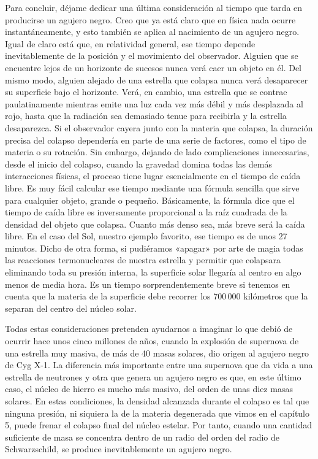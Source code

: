 Para concluir, déjame dedicar una última consideración al tiempo que tarda en producirse un agujero negro. Creo que ya está claro que en física nada ocurre instantáneamente, y esto también se aplica al nacimiento de un agujero negro. Igual de claro está que, en relatividad general, ese tiempo depende inevitablemente de la posición y el movimiento del observador. Alguien que se encuentre lejos de un horizonte de sucesos nunca verá caer un objeto en él. Del mismo modo, alguien alejado de una estrella que colapsa nunca verá desaparecer su superficie bajo el horizonte. Verá, en cambio, una estrella que se contrae paulatinamente mientras emite una luz cada vez más débil y más desplazada al rojo, hasta que la radiación sea demasiado tenue para recibirla y la estrella desaparezca. Si el observador cayera junto con la materia que colapsa, la duración precisa del colapso dependería en parte de una serie de factores, como el tipo de materia o su rotación. Sin embargo, dejando de lado complicaciones innecesarias, desde el inicio del colapso, cuando la gravedad domina todas las demás interacciones físicas, el proceso tiene lugar esencialmente en el tiempo de caída libre. Es muy fácil calcular ese tiempo mediante una fórmula sencilla que sirve para cualquier objeto, grande o pequeño. Básicamente, la fórmula dice que el tiempo de caída libre es inversamente proporcional a la raíz cuadrada de la densidad del objeto que colapsa. Cuanto más denso sea, más breve será la caída libre. En el caso del Sol, nuestro ejemplo favorito, ese tiempo es de unos 27 minutos. Dicho de otra forma, si pudiéramos «apagar» por arte de magia todas las reacciones termonucleares de nuestra estrella y permitir que colapsara eliminando toda su presión interna, la superficie solar llegaría al centro en algo menos de media hora. Es un tiempo sorprendentemente breve si tenemos en cuenta que la materia de la superficie debe recorrer los 700\,000 kilómetros que la separan del centro del núcleo solar.

Todas estas consideraciones pretenden ayudarnos a imaginar lo que debió de ocurrir hace unos cinco millones de años, cuando la explosión de supernova de una estrella muy masiva, de más de 40 masas solares, dio origen al agujero negro de Cyg X-1. La diferencia más importante entre una supernova que da vida a una estrella de neutrones y otra que genera un agujero negro es que, en este último caso, el núcleo de hierro es mucho más masivo, del orden de unas diez masas solares. En estas condiciones, la densidad alcanzada durante el colapso es tal que ninguna presión, ni siquiera la de la materia degenerada que vimos en el capítulo 5, puede frenar el colapso final del núcleo estelar. Por tanto, cuando una cantidad suficiente de masa se concentra dentro de un radio del orden del radio de Schwarzschild, se produce inevitablemente un agujero negro.

